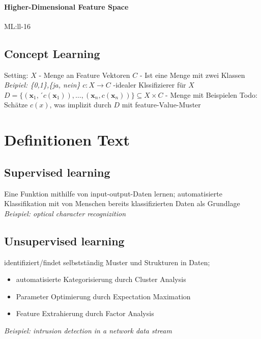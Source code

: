 \documentclass[11pt,a4paper]{article}
\begin{document}
\begin{flushleft}
\paragraph{Higher-Dimensional Feature Space} ML:ll-16


\subsection{Concept Learning}
Setting:\newline
$X$ - Menge an Feature Vektoren\newline
$C$ - Ist eine Menge mit zwei Klassen \textit{Beipiel: \{0,1\},\{ja, nein\}} \newline
$c: X \rightarrow C$ -idealer Klssifizierer für $X$ \newline
$D=\{(\mathbf{x}_1,´c(\mathbf{x}_1)),\dots,(\mathbf{x}_n,c(\mathbf{x}_n))\} \subseteq X \times C$ - Menge mit Beispielen \newline
Todo: \newline
Schätze $c(x)$, was implizit durch $D$ mit feature-Value-Muster


\newpage
\section{Definitionen Text}
\subsection{Supervised learning} 
    Eine Funktion mithilfe von input-output-Daten lernen; \newline
    automatisierte Klassifikation mit von Menschen bereits klassifizierten Daten als Grundlage \newline
    \textit{Beispiel: optical character recognizition}
    
\subsection{Unsupervised learning}
    identifiziert/findet selbstständig Muster und Strukturen in Daten; \newline
    \begin{itemize}
        \item automatisierte Kategorisierung durch Cluster Analysis
        \item Parameter Optimierung durch Expectation Maximation
        \item Feature Extrahierung durch Factor Analysis
    \end{itemize}
    \textit{Beispiel: intrusion detection in a network data stream}
    

\end{flushleft}
\end{document}

